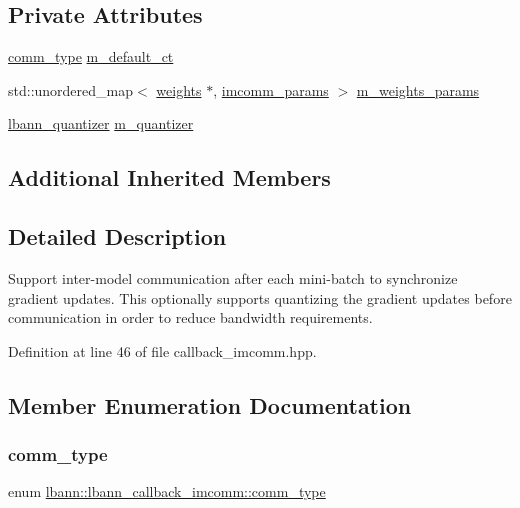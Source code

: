 \subsection*{Private Attributes}
\begin{DoxyCompactItemize}
\item 
\hyperlink{classlbann_1_1lbann__callback__imcomm_acf7e894b3381e7f9b71020dc73594d6a}{comm\+\_\+type} \hyperlink{classlbann_1_1lbann__callback__imcomm_ac3df687b12721a7278877c303357bc09}{m\+\_\+default\+\_\+ct}
\item 
std\+::unordered\+\_\+map$<$ \hyperlink{classlbann_1_1weights}{weights} $\ast$, \hyperlink{structlbann_1_1lbann__callback__imcomm_1_1imcomm__params}{imcomm\+\_\+params} $>$ \hyperlink{classlbann_1_1lbann__callback__imcomm_a32a0319c91aff324cb3468de4f31dd50}{m\+\_\+weights\+\_\+params}
\item 
\hyperlink{classlbann_1_1lbann__quantizer}{lbann\+\_\+quantizer} \hyperlink{classlbann_1_1lbann__callback__imcomm_a4994863d7f69e801c042c5d460bb3f34}{m\+\_\+quantizer}
\end{DoxyCompactItemize}
\subsection*{Additional Inherited Members}


\subsection{Detailed Description}
Support inter-\/model communication after each mini-\/batch to synchronize gradient updates. This optionally supports quantizing the gradient updates before communication in order to reduce bandwidth requirements. 

Definition at line 46 of file callback\+\_\+imcomm.\+hpp.



\subsection{Member Enumeration Documentation}
\mbox{\label{classlbann_1_1lbann__callback__imcomm_acf7e894b3381e7f9b71020dc73594d6a}} 
\subsubsection{\texorpdfstring{comm\+\_\+type}{comm\_type}}
{\footnotesize\ttfamily enum \hyperlink{classlbann_1_1lbann__callback__imcomm_acf7e894b3381e7f9b71020dc73594d6a}{lbann\+::lbann\+\_\+callback\+\_\+imcomm\+::comm\+\_\+type}}

